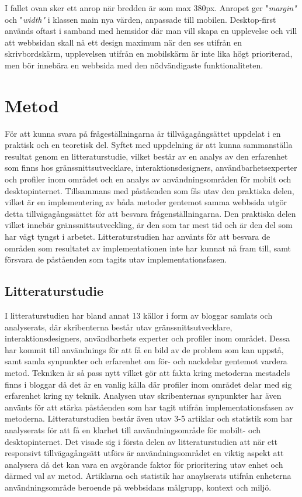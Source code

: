 \documentclass[11pt]{article}
\begin{document}
I fallet ovan sker ett anrop när bredden är som max 380px. Anropet ger "\textit{margin"} och "\textit{width"} i klassen main nya värden, anpassade till mobilen.  Desktop-first används oftast i samband med hemsidor där man vill skapa en upplevelse och vill att webbsidan skall nå ett design maximum när den ses utifrån en skrivbordskärm, upplevelsen utifrån en mobilskärm är inte lika högt prioriterad, men bör innebära en webbsida med den nödvändigaste funktionaliteten.
\newpage

\section{Metod}
För att kunna svara på frågeställningarna är tillvägagångsättet uppdelat i en praktisk och en teoretisk del. Syftet med uppdelning är att kunna sammanställa resultat genom en litteraturstudie, vilket består av en analys av den erfarenhet som finns hos gränssnittsutvecklare, interaktionsdesigners, användbarhetsexperter och profiler inom området och en analys av användningsområden för mobilt och desktopinternet. Tillsammans med påståenden som fås utav den praktiska delen, vilket är en implementering av båda metoder gentemot samma webbsida utgör detta tillvägagångssättet för att besvara frågenställningarna. Den praktiska delen vilket innebär gränssnittsutveckling, är den som tar mest tid och är den del som har vägt tyngst i arbetet. Litteraturstudien har använts för att besvara de områden som resultatet av implementationen inte har kunnat nå fram till, samt försvara de påståenden som tagits utav implementationsfasen.


\subsection{Litteraturstudie}
I litteraturstudien har bland annat 13 källor i form av bloggar samlats och analyserats, där skribenterna består utav gränssnittsutvecklare, interaktionsdesigners, användbarhets experter och profiler inom området. Dessa har kommit till användnings för att få en bild av de problem som kan uppstå, samt samla synpunkter och erfarenhet om för- och nackdelar gentemot vardera metod. Tekniken är så pass nytt vilket gör att fakta kring metoderna mestadels finns i bloggar då det är en vanlig källa där profiler inom området delar med sig erfarenhet kring ny teknik. Analysen utav skribenternas synpunkter har även använts för att stärka påståenden som har tagit utifrån implementationsfasen av metoderna. Litteraturstudien består även utav 3-5 artiklar och statistik som har analyserats för att få en klarhet till användningsområde för mobilt- och desktopinternet. Det visade sig i första delen av litteraturstudien att när ett responsivt tillvägagångsätt utförs är användningsområdet en viktig aspekt att analysera då det kan vara en avgörande faktor för prioritering utav enhet och därmed val av metod. Artiklarna och statistik har anaylserats utifrån enheterna användningsområde beroende på webbsidans målgrupp, kontext och miljö.
\end{document}
